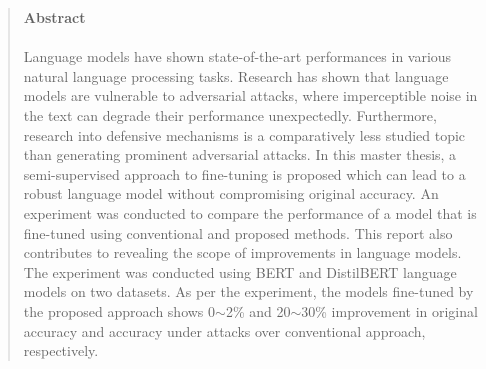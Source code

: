\begin{quote}
	\textbf{\Large Abstract}\\\\
    Language models have shown state-of-the-art performances in various natural language processing tasks. Research has shown that language models are vulnerable to adversarial attacks, where imperceptible noise in the text can degrade their performance unexpectedly. Furthermore, research into defensive mechanisms is a comparatively less studied topic than generating prominent adversarial attacks. In this master thesis, a semi-supervised approach to fine-tuning is proposed which can lead to a robust language model without compromising original accuracy. An experiment was conducted to compare the performance of a model that is fine-tuned using conventional and proposed methods. This report also contributes to revealing the scope of improvements in language models. The experiment was conducted using BERT and DistilBERT language models on two datasets. As per the experiment, the models fine-tuned by the proposed approach shows  0$\sim$2\% and  20$\sim$30\% improvement in original accuracy and accuracy under attacks over conventional approach, respectively. 

\end{quote}
